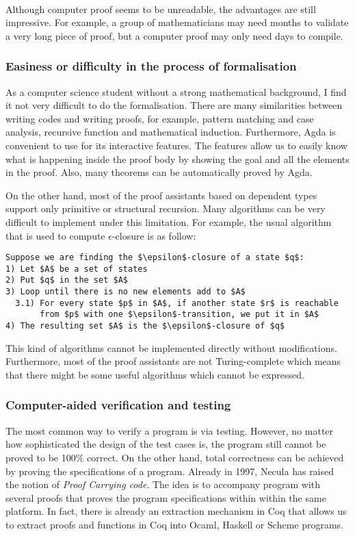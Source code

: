 \paragraph{} Although computer proof seems to be unreadable, the advantages
are still impressive. For example, a group
of mathematicians may need months to validate a very long piece of
proof, but a computer proof may only need days to
compile. 


\subsubsection{Easiness or difficulty in the process of formalisation}
\par As a computer science student without a strong mathematical
background, I find it not very difficult to do the
formalisation. There are many similarities between writing codes and writing
proofs, for example, pattern matching and case analysis, recursive
function and mathematical induction. Furthermore, Agda is convenient
to use for its interactive features. The features allow us to easily know
what is happening inside the proof body by showing the goal and all the
elements in the proof. Also, many theorems can be automatically proved
by Agda. 
\par On the other hand, most of the
proof assistants based on dependent types support only primitive or
structural recursion. Many algorithms can be very difficult to
implement under this limitation. For example, the usual algorithm that is used to compute
\(\epsilon\)-closure is as follow:
\begin{lstlisting}[mathescape=true,xleftmargin=.3\textwidth]
Suppose we are finding the $\epsilon$-closure of a state $q$:
1) Let $A$ be a set of states
2) Put $q$ in the set $A$
3) Loop until there is no new elements add to $A$
  3.1) For every state $p$ in $A$, if another state $r$ is reachable
       from $p$ with one $\epsilon$-transition, we put it in $A$
4) The resulting set $A$ is the $\epsilon$-closure of $q$
\end{lstlisting} 
\par This kind of algorithms cannot be implemented directly without
modifications. Furthermore, most of the proof assistants are
not Turing-complete which means that there
might be some useful algorithms which cannot be expressed. 


\subsubsection{Computer-aided verification and testing}
\par The most common way to verify a program is via testing. However,
no matter how sophisticated the design of the test cases is, the
program still cannot be proved to be 100\% correct. On the other
hand, total correctness can be achieved by proving the specifications
of a program. Already in 1997, Necula \cite{necula1997} has raised the
notion of \textit{Proof Carrying code}. The idea is to accompany
program with several proofs that proves the program specifications
within within the same platform. In fact, there is already an
extraction mechanism \cite{letouzey2008} in Coq that allows us to
extract proofs and functions in Coq into Ocaml, Haskell or Scheme programs. 